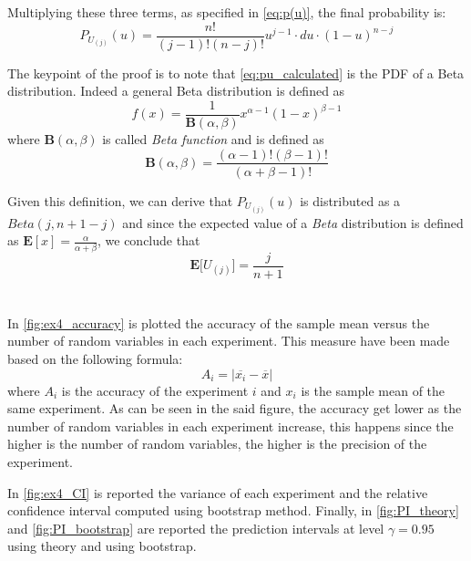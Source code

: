 \documentclass[11pt,a4paper]{article}
\begin{document}
Multiplying these three terms, as specified in \autoref{eq:p(u)}, the final probability is:
\begin{equation}
  \label{eq:pu_calculated}
  P_{U_{(j)}}(u) = \frac{n!}{(j-1)!(n-j)!}u^{j-1}\cdot du \cdot (1-u)^{n-j}
\end{equation}

The keypoint of the proof is to note that \autoref{eq:pu_calculated} is the PDF of a Beta distribution.
Indeed a general Beta distribution is defined as
\begin{equation}
  \label{eq:beta}
  f(x) = \frac{1}{\mathbf{B}(\alpha,\beta)}x^{\alpha-1}(1-x)^{\beta-1}
\end{equation}
where $\mathbf{B}(\alpha,\beta)$ is called \textit{Beta function} and is defined as
\begin{equation}
  \label{eq:beta_func}
  \mathbf{B}(\alpha,\beta) = \frac{(\alpha-1)!(\beta-1)!}{(\alpha+\beta-1)!}
\end{equation}

Given this definition, we can derive that $P_{U_{(j)}}(u)$ is distributed as a $Beta(j,n+1-j)$ and since the expected value of a \textit{Beta} distribution is defined as $\mathbf{E}[x] = \frac{\alpha}{\alpha+\beta}$, we conclude that
\begin{equation}
  \label{eq:ex_value}
  \mathbf{E}\bigg[U_{(j)}\bigg] = \frac{j}{n+1}
\end{equation}

\section{}

In \autoref{fig:ex4_accuracy} is plotted the accuracy of the sample mean versus the number of random variables in each experiment. This measure have been made based on the following formula:
\begin{equation}
  A_i = |\overline{x_i} - \overline{x}|
\end{equation}
where $A_i$ is the accuracy of the experiment $i$ and $x_i$ is the sample mean of the same experiment. As can be seen in the said figure, the accuracy get lower as the number of random variables in each experiment increase, this happens since the higher is the number of random variables, the higher is the precision of the experiment.

In \autoref{fig:ex4_CI} is reported the variance of each experiment and the relative confidence interval computed using bootstrap method.
Finally, in \autoref{fig:PI_theory} and \autoref{fig:PI_bootstrap} are reported the prediction intervals at level $\gamma = 0.95$ using theory and using bootstrap.
\end{document}
